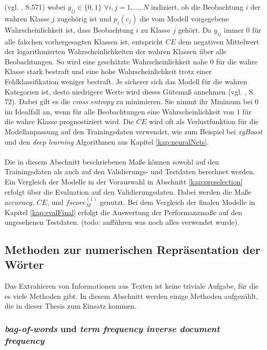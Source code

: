 \documentclass[a4paper,11pt]{article}
\begin{document}
(vgl. \cite{murphy}, S.571) wobei $y_{ij} \in \{0,1\}$ \hspace{0.2cm} $\forall i, j = 1,...,N$ indiziert, ob die Beobachtung $i$ der wahren Klasse $j$ zugehörig ist und $p_i(c_j)$ die vom Modell vorgegebene Wahrscheinlichkeit ist, dass Beobachtung $i$ zu Klasse $j$ gehört. Da $y_{ij}$ immer $0$ für alle falschen vorhergesagten Klassen ist, entspricht $CE$ dem negativen Mittelwert der logarithmierten Wahrscheinlichkeiten der wahren Klassen über alle Beobachtungen. So wird eine geschätzte Wahrscheinlichkeit nahe $0$ für die wahre Klasse stark bestraft und eine hohe Wahrscheinlichkeit trotz einer Fehlklassifikation weniger bestraft. Je sicherer sich das Modell für die wahren Kategorien ist, desto niedrigere Werte wird dieses Gütemaß annehmen (vgl. \cite{proMachine}, S. 72). 
Dabei gilt es die \textit{cross entropy} zu minimieren. Sie nimmt ihr Minimum bei $0$ im Idealfall an, wenn für alle Beobachtungen eine Wahrscheinlichkeit von $1$ für die wahre Klasse prognostiziert wird. Die $CE$ wird oft als Verlustfunktion für die Modellanpassung auf den Trainingsdaten verwendet, wie zum Beispiel bei \textit{xgBoost} und den \textit{deep learning} Algorithmen aus Kapitel \ref{kap:neuralNets}.\\
\\
Die in diesem Abschnitt beschriebenen Maße können sowohl auf den Trainingsdaten als auch auf den  Validierungs- und Testdaten berechnet werden. Ein Vergleich der Modelle in der Vorauswahl in Abschnitt \ref{kap:preselection} erfolgt über die Evaluation auf den Validierungsdaten. Dabei werden die Maße $accuracy$, $CE$, und $fscore_M^{(1)}$ genutzt.
Bei dem Vergleich der finalen Modelle in Kapitel \ref{kap:evalFinal} erfolgt die Auswertung der Performanzmaße auf den ungesehenen Testdaten. (todo: aufführen was noch alles verwendet wurde).


\subsection{Methoden zur numerischen Repräsentation der Wörter} \label{kap:3.1Wordemb}

Das Extrahieren von Informationen aus Texten ist keine triviale Aufgabe, für die es viele Methoden gibt. In diesem Abschnitt werden einige Methoden aufgezählt, die in dieser Thesis zum Einsatz kommen.


\subsubsection{\textit{bag-of-words} und \textit{term frequency inverse document frequency}} \label{Kap:Tfidf}
\end{document}
